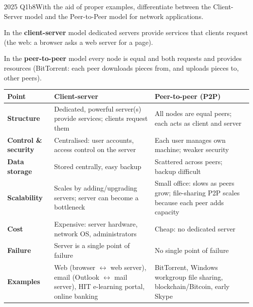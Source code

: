 \documentclass[10pt]{article}
\begin{document}
\begin{pastq}{2025 Q1b}{8}With the aid of proper examples, differentiate between the Client-Server model and the Peer-to-Peer model for network applications.\end{pastq}
\begin{ans}
In the \textbf{client-server} model dedicated servers provide services that clients request (the web: a browser asks a web server for a page).\par
In the \textbf{peer-to-peer} model every node is equal and both requests and provides resources (BitTorrent: each peer downloads pieces from, and uploads pieces to, other peers).\par
\small
\begin{tabularx}{\linewidth}{@{}>{\bfseries}p{1.9cm}XX@{}}
\toprule
Point & Client-server & Peer-to-peer (P2P)\\\midrule
Structure & Dedicated, powerful server(s) provide services; clients request them & All nodes are equal peers; each acts as client and server\\
Control \& security & Centralised: user accounts, access control on the server & Each user manages own machine; weaker security\\
Data storage & Stored centrally, easy backup & Scattered across peers; backup difficult\\
Scalability & Scales by adding/upgrading servers; server can become a bottleneck & Small office: slows as peers grow; file-sharing P2P scales because each peer adds capacity\\
Cost & Expensive: server hardware, network OS, administrators & Cheap: no dedicated server\\
Failure & Server is a single point of failure & No single point of failure\\
Examples & Web (browser $\leftrightarrow$ web server), email (Outlook $\leftrightarrow$ mail server), HIT e-learning portal, online banking & BitTorrent, Windows workgroup file sharing, blockchain/Bitcoin, early Skype\\
\bottomrule
\end{tabularx}
\end{ans}
\end{document}
